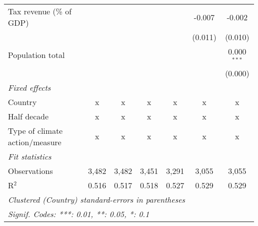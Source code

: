 \begin{tabular}{lcccccc}
   Tax revenue (\% of GDP)              &         &              &               &              & -0.007        & -0.002\\   
                                        &         &              &               &              & (0.011)       & (0.010)\\   
   Population total                     &         &              &               &              &               & 0.000$^{***}$\\   
                                        &         &              &               &              &               & (0.000)\\   
   \emph{Fixed effects}\\
   Country                              & x       & x            & x             & x            & x             & x\\  
   Half decade                          & x       & x            & x             & x            & x             & x\\  
   Type of climate action/measure       & x       & x            & x             & x            & x             & x\\  
   \midrule \emph{Fit statistics}\\
   Observations                         & 3,482   & 3,482        & 3,451         & 3,291        & 3,055         & 3,055\\  
   R$^2$                                & 0.516   & 0.517        & 0.518         & 0.527        & 0.529         & 0.529\\  
   \midrule
   \multicolumn{7}{l}{\emph{Clustered (Country) standard-errors in parentheses}}\\
   \multicolumn{7}{l}{\emph{Signif. Codes: ***: 0.01, **: 0.05, *: 0.1}}\\
\end{tabular}
\par\endgroup


